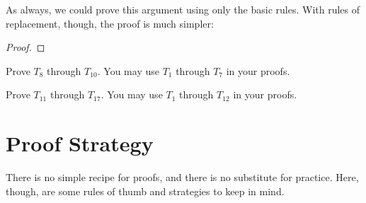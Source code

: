 {As always, we could prove this argument using only the basic rules. With rules of replacement, though, the proof is much simpler:

 

\begin{proof}
\end{proof}









 

\practiceproblems
\noindent\problempart
Prove $T_{8}$ through $T_{10}$. You may use $T_{1}$ through $T_7$ in your proofs.

\noindent\problempart
Prove $T_{11}$ through $T_{17}$. You may use $T_{1}$ through $T_{12}$ in your proofs.






\section{Proof Strategy}
\setlength{\parindent}{1em}
There is no simple recipe for proofs, and there is no substitute for practice. Here, though, are some rules of thumb and strategies to keep in mind.

}
